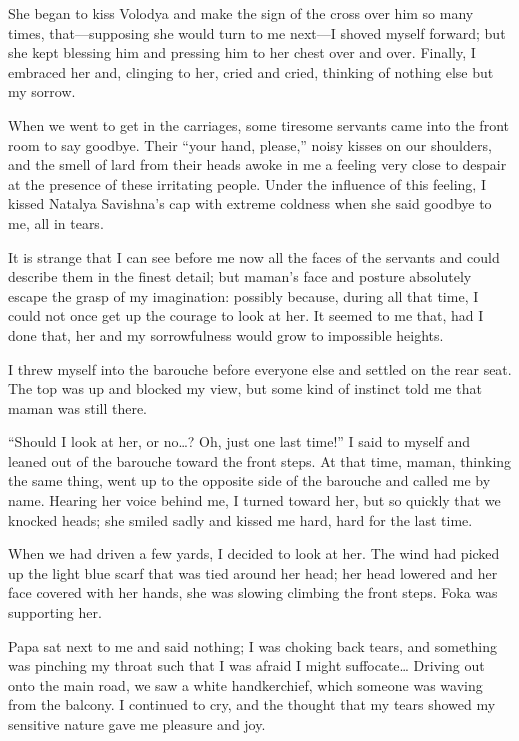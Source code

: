 She began to kiss Volodya and make the sign of the cross over him so many times, that---supposing she would turn to me next---I shoved myself forward; but she kept blessing him and pressing him to her chest over and over. Finally, I embraced her and, clinging to her, cried and cried, thinking of nothing else but my sorrow.

When we went to get in the carriages, some tiresome servants came into the front room to say goodbye. Their ``your hand, please,'' noisy kisses on our shoulders, and the smell of lard from their heads awoke in me a feeling very close to despair at the presence of these irritating people. Under the influence of this feeling, I kissed Natalya Savishna's cap with extreme coldness when she said goodbye to me, all in tears.

It is strange that I can see before me now all the faces of the servants and could describe them in the finest detail; but maman's face and posture absolutely escape the grasp of my imagination: possibly because, during all that time, I could not once get up the courage to look at her. It seemed to me that, had I done that, her and my sorrowfulness would grow to impossible heights.

I threw myself into the barouche before everyone else and settled on the rear seat. The top was up and blocked my view, but some kind of instinct told me that maman was still there.

``Should I look at her, or no\ldots{}? Oh, just one last time!'' I said to myself and leaned out of the barouche toward the front steps. At that time, maman, thinking the same thing, went up to the opposite side of the barouche and called me by name. Hearing her voice behind me, I turned toward her, but so quickly that we knocked heads; she smiled sadly and kissed me hard, hard for the last time.

When we had driven a few yards, I decided to look at her. The wind had picked up the light blue scarf that was tied around her head; her head lowered and her face covered with her hands, she was slowing climbing the front steps. Foka was supporting her.

Papa sat next to me and said nothing; I was choking back tears, and something was pinching my throat such that I was afraid I might suffocate\ldots{} Driving out onto the main road, we saw a white handkerchief, which someone was waving from the balcony. I continued to cry, and the thought that my tears showed my sensitive nature gave me pleasure and joy.

